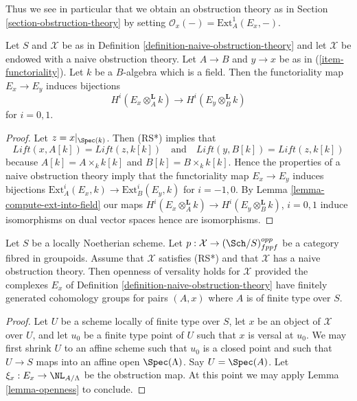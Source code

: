 \noindent
Thus we see in particular that we obtain an obstruction theory
as in Section \ref{section-obstruction-theory} by setting
$\mathcal{O}_x( - ) = \text{Ext}^1_A(E_x, -)$.

\begin{lemma}
\label{lemma-naive-obstruction-theory-qis}
Let $S$ and $\mathcal{X}$ be as in
Definition \ref{definition-naive-obstruction-theory}
and let $\mathcal{X}$ be endowed with a naive obstruction theory.
Let $A \to B$ and $y \to x$ be as in (\ref{item-functoriality}).
Let $k$ be a $B$-algebra which is a field. Then the functoriality
map $E_x \to E_y$ induces bijections
$$
H^i(E_x \otimes_A^{\mathbf{L}} k) \to H^i(E_y \otimes_B^{\mathbf{L}} k)
$$
for $i = 0, 1$.
\end{lemma}

\begin{proof}
Let $z = x|_{\Spec(k)}$. Then (RS*) implies that
$$
\textit{Lift}(x, A[k]) = \textit{Lift}(z, k[k])
\quad\text{and}\quad
\textit{Lift}(y, B[k]) = \textit{Lift}(z, k[k])
$$
because $A[k] = A \times_k k[k]$ and $B[k] = B \times_k k[k]$.
Hence the properties of a naive obstruction theory imply that the
functoriality map $E_x \to E_y$ induces bijections
$\text{Ext}^i_A(E_x, k) \to \text{Ext}^i_B(E_y, k)$
for $i = -1, 0$. By Lemma \ref{lemma-compute-ext-into-field} our maps
$H^i(E_x \otimes_A^{\mathbf{L}} k) \to H^i(E_y \otimes_B^{\mathbf{L}} k)$,
$i = 0, 1$ induce isomorphisms on dual vector spaces hence are isomorphisms.
\end{proof}

\begin{lemma}
\label{lemma-naive-obstruction-theory-gives-openness}
Let $S$ be a locally Noetherian scheme. Let
$p : \mathcal{X} \to (\Sch/S)_{fppf}^{opp}$ be a category fibred in groupoids.
Assume that $\mathcal{X}$ satisfies (RS*)
and that $\mathcal{X}$ has a naive obstruction theory.
Then openness of versality holds for $\mathcal{X}$ provided the
complexes $E_x$ of Definition \ref{definition-naive-obstruction-theory}
have finitely generated cohomology groups for pairs $(A, x)$ where
$A$ is of finite type over $S$.
\end{lemma}

\begin{proof}
Let $U$ be a scheme locally of finite type over $S$, let $x$ be an object of
$\mathcal{X}$ over $U$, and let $u_0$ be a finite type point of $U$ such that
$x$ is versal at $u_0$. We may first shrink $U$ to an affine scheme such
that $u_0$ is a closed point and such that $U \to S$ maps into an affine
open $\Spec(\Lambda)$. Say $U = \Spec(A)$. Let
$\xi_x : E_x \to \NL_{A/\Lambda}$ be the obstruction map.
At this point we may apply Lemma \ref{lemma-openness} to conclude.
\end{proof}









